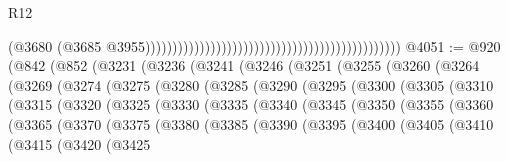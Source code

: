 \begin{lexlean}{R12}
\begin{coremodule}
                                                                                              (@3680
                                                                                                (@3685
                                                                                                  @3955)))))))))))))))))))))))))))))))))))))))))))))))
@4051 := @920
    (@842
      (@852
        (@3231
          (@3236
            (@3241
              (@3246
                (@3251
                  (@3255
                    (@3260
                      (@3264
                        (@3269
                          (@3274
                            (@3275
                              (@3280
                                (@3285
                                  (@3290
                                    (@3295
                                      (@3300
                                        (@3305
                                          (@3310
                                            (@3315
                                              (@3320
                                                (@3325
                                                  (@3330
                                                    (@3335
                                                      (@3340
                                                        (@3345
                                                          (@3350
                                                            (@3355
                                                              (@3360
                                                                (@3365
                                                                  (@3370
                                                                    (@3375
                                                                      (@3380
                                                                        (@3385
                                                                          (@3390
                                                                            (@3395
                                                                              (@3400
                                                                                (@3405
                                                                                  (@3410
                                                                                    (@3415
                                                                                      (@3420
                                                                                        (@3425

\end{coremodule}
\end{lexlean}
